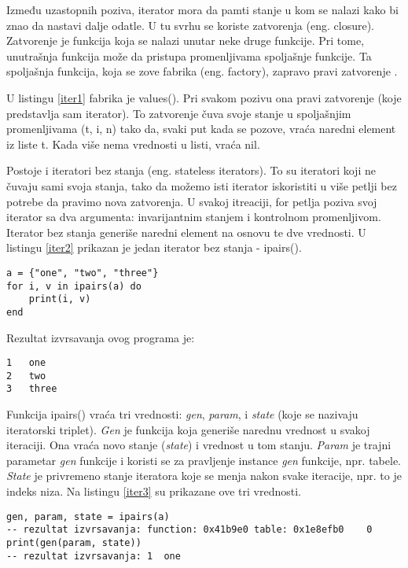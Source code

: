 \documentclass[a4paper]{article}
\begin{document}
Između uzastopnih poziva, iterator mora da pamti stanje u kom se nalazi kako bi znao da nastavi dalje odatle. U tu svrhu se koriste zatvorenja (eng. closure). Zatvorenje je funkcija koja se nalazi unutar neke druge funkcije. Pri tome, unutrašnja funkcija može da pristupa promenljivama spoljašnje funkcije. Ta spoljašnja funkcija, koja se zove fabrika (eng. factory), zapravo pravi zatvorenje \cite{lua_org_iterators}.

U listingu \ref{iter1} fabrika je values(). Pri svakom pozivu ona pravi zatvorenje (koje predstavlja sam iterator). To zatvorenje čuva svoje stanje u spoljašnjim promenljivama (t, i, n) tako da, svaki put kada se pozove, vraća naredni element iz liste t. Kada više nema vrednosti u listi, vraća nil.

Postoje i iteratori bez stanja (eng. stateless iterators). To su iteratori koji ne čuvaju sami svoja stanja, tako da možemo isti iterator iskoristiti u više petlji bez potrebe da pravimo nova zatvorenja. U svakoj itreaciji, for petlja poziva svoj iterator sa dva argumenta: invarijantnim stanjem i kontrolnom promenljivom. Iterator bez stanja generiše naredni element na osnovu te dve vrednosti. U listingu \ref{iter2} prikazan je jedan iterator bez stanja - ipairs()\cite{bookProgInLua}.

\begin{lstlisting}[caption={Primer iteratora bez stanja},frame=single, label=iter2]
a = {"one", "two", "three"}
for i, v in ipairs(a) do
	print(i, v)
end
\end{lstlisting}
Rezultat izvrsavanja ovog programa je:
\begin{verbatim}
1	one
2	two
3	three
\end{verbatim}
Funkcija ipairs() vraća tri vrednosti: \textit{gen}, \textit{param}, i \textit{state} (koje se nazivaju iteratorski triplet). \textit{Gen} je funkcija koja generiše narednu vrednost u svakoj iteraciji. Ona vraća novo stanje (\textit{state}) i vrednost u tom stanju. \textit{Param} je trajni parametar \textit{gen} funkcije i koristi se za pravljenje instance \textit{gen} funkcije, npr. tabele. \textit{State} je privremeno stanje iteratora koje se menja nakon svake iteracije, npr. to je indeks niza\cite{luafun}. Na listingu \ref{iter3} su prikazane ove tri vrednosti.
\begin{lstlisting}[caption={Primer iteratora bez stanja (nastavak)},frame=single, label=iter3]
gen, param, state = ipairs(a)
-- rezultat izvrsavanja: function: 0x41b9e0	table: 0x1e8efb0	0
print(gen(param, state))
-- rezultat izvrsavanja: 1	one
\end{lstlisting}
\end{document}
